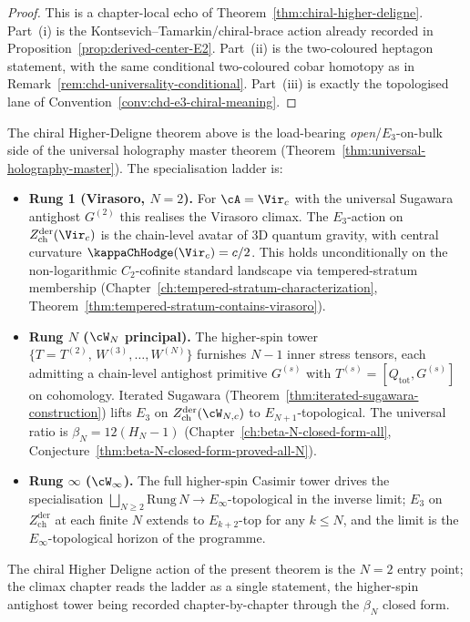 \begin{proof}
This is a chapter-local echo of
Theorem~\ref{thm:chiral-higher-deligne}. Part~(i) is the
Kontsevich--Tamarkin/chiral-brace action already recorded in
Proposition~\ref{prop:derived-center-E2}. Part~(ii) is the
two-coloured heptagon statement, with the same conditional
two-coloured cobar homotopy as in
Remark~\ref{rem:chd-universality-conditional}. Part~(iii) is exactly
the topologised lane of Convention~\ref{conv:chd-e3-chiral-meaning}.
\end{proof}

\begin{remark}%
\label{rem:higher-deligne-climax-placement}%
%
%
%
The chiral Higher-Deligne theorem above is the load-bearing
\emph{open}/$E_3$-on-bulk side of the universal holography master
theorem (Theorem~\ref{thm:universal-holography-master}). The
specialisation ladder is:
\begin{itemize}[nosep]
\item \textbf{Rung 1 (Virasoro, $N=2$).} For $\cA = \Vir_c$
 with the universal Sugawara antighost $G^{(2)}$ this realises the Virasoro
 climax. The $E_3$-action on $Z^{\mathrm{der}}_{\mathrm{ch}}(\Vir_c)$ is
 the chain-level avatar of 3D quantum gravity, with central curvature
 $\kappaChHodge(\Vir_c) = c/2$. This
 holds unconditionally on the non-logarithmic $C_2$-cofinite standard
 landscape via tempered-stratum membership
 (Chapter~\ref{ch:tempered-stratum-characterization},
 Theorem~\ref{thm:tempered-stratum-contains-virasoro}).
\item \textbf{Rung $N$ ($\cW_N$ principal).}
 The higher-spin tower
 $\{T = T^{(2)},\,W^{(3)},\ldots,W^{(N)}\}$ furnishes
 $N{-}1$ inner stress tensors, each admitting a chain-level antighost
 primitive $G^{(s)}$ with $T^{(s)} = [Q_{\mathrm{tot}}, G^{(s)}]$ on
 cohomology. Iterated Sugawara
 (Theorem~\ref{thm:iterated-sugawara-construction}) lifts $E_3$ on
 $Z^{\mathrm{der}}_{\mathrm{ch}}(\cW_{N,c})$ to $E_{N+1}$-topological. The
 universal ratio is $\beta_N = 12(H_N - 1)$
 (Chapter~\ref{ch:beta-N-closed-form-all},
 Conjecture~\ref{thm:beta-N-closed-form-proved-all-N}).
\item \textbf{Rung $\infty$ ($\cW_\infty$).}
 The full higher-spin Casimir tower drives the
 specialisation $\bigsqcup_{N\ge 2} \mathrm{Rung}\,N \to E_\infty$-topological
 in the inverse limit; $E_3$ on $Z^{\mathrm{der}}_{\mathrm{ch}}$ at
 each finite $N$ extends to $E_{k+2}$-top for any $k \le N$, and the
 limit is the $E_\infty$-topological horizon of the programme.
\end{itemize}
The chiral Higher Deligne action of the present theorem is the
$N=2$ entry point; the climax chapter reads the
ladder as a single statement, the higher-spin antighost tower being
recorded chapter-by-chapter through the $\beta_N$ closed form.
\end{remark}

